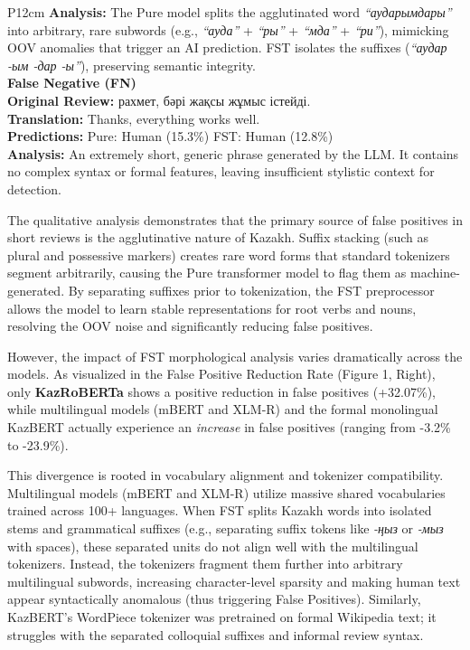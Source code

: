 \documentclass[runningheads]{llncs}
\begin{document}
\begin{table}[htbp]
{\begin{tabular}{P{12cm}}
\textbf{Analysis:} The Pure model splits the agglutinated word \textit{``аударымдары''} into arbitrary, rare subwords (e.g., \textit{``ауда''} + \textit{``ры''} + \textit{``мда''} + \textit{``ри''}), mimicking OOV anomalies that trigger an AI prediction. FST isolates the suffixes (\textit{``аудар -ым -дар -ы''}), preserving semantic integrity. \\
\midrule
\textbf{False Negative (FN)} \\
\smallskip
\textbf{Original Review:} рахмет, бәрі жақсы жұмыс істейді. \\
\textbf{Translation:} Thanks, everything works well. \\
\textbf{Predictions:} Pure: Human (15.3\%) \hfill FST: Human (12.8\%) \\
\textbf{Analysis:} An extremely short, generic phrase generated by the LLM. It contains no complex syntax or formal features, leaving insufficient stylistic context for detection. \\
\bottomrule
\end{tabular}%
}
\end{table}

The qualitative analysis demonstrates that the primary source of false positives in short reviews is the agglutinative nature of Kazakh. Suffix stacking (such as plural and possessive markers) creates rare word forms that standard tokenizers segment arbitrarily, causing the Pure transformer model to flag them as machine-generated. By separating suffixes prior to tokenization, the FST preprocessor allows the model to learn stable representations for root verbs and nouns, resolving the OOV noise and significantly reducing false positives.

However, the impact of FST morphological analysis varies dramatically across the models. As visualized in the False Positive Reduction Rate (Figure 1, Right), only \textbf{KazRoBERTa} shows a positive reduction in false positives (+32.07\%), while multilingual models (mBERT and XLM-R) and the formal monolingual KazBERT actually experience an \textit{increase} in false positives (ranging from -3.2\% to -23.9\%). 

This divergence is rooted in vocabulary alignment and tokenizer compatibility. Multilingual models (mBERT and XLM-R) utilize massive shared vocabularies trained across 100+ languages. When FST splits Kazakh words into isolated stems and grammatical suffixes (e.g., separating suffix tokens like \textit{-ңыз} or \textit{-мыз} with spaces), these separated units do not align well with the multilingual tokenizers. Instead, the tokenizers fragment them further into arbitrary multilingual subwords, increasing character-level sparsity and making human text appear syntactically anomalous (thus triggering False Positives). Similarly, KazBERT's WordPiece tokenizer was pretrained on formal Wikipedia text; it struggles with the separated colloquial suffixes and informal review syntax. 
\end{document}
